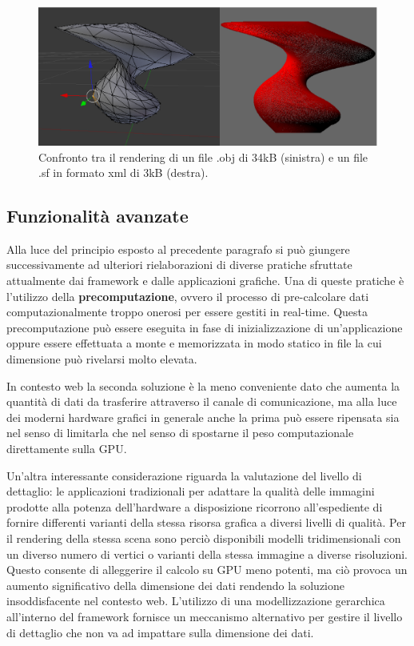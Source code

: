 \begin{figure}
\begin{center}
\includegraphics[width=\textwidth]{Immagini/funghiwall}
\caption[Confronto tra rendering di un file obj e un sf.]{Confronto tra il rendering di un file .obj di 34\ac{kB} (sinistra) e un file .sf in formato xml di 3\ac{kB} (destra).\label{f:funghiwall}} 
\end{center} 
\end{figure}

\subsection{Funzionalit\`a avanzate}
Alla luce del principio esposto al precedente paragrafo si pu\`o giungere successivamente ad ulteriori rielaborazioni di diverse pratiche sfruttate attualmente dai framework e dalle applicazioni grafiche. Una di queste pratiche \`e l'utilizzo della \textbf{precomputazione}, ovvero il processo di pre-calcolare dati computazionalmente troppo onerosi per essere gestiti in real-time. Questa precomputazione pu\`o essere eseguita in fase di inizializzazione di un'applicazione oppure essere effettuata a monte e memorizzata in modo statico in file la cui dimensione pu\`o rivelarsi molto elevata. 

In contesto web la seconda soluzione \`e la meno conveniente dato che aumenta la quantit\`a di dati da trasferire attraverso il canale di comunicazione, ma alla luce dei moderni hardware grafici in generale anche la prima pu\`o essere ripensata sia nel senso di limitarla che nel senso di spostarne il peso computazionale direttamente sulla \ac{GPU}.

Un'altra interessante considerazione riguarda la valutazione del livello di dettaglio: le applicazioni tradizionali per adattare la qualit\`a delle immagini prodotte alla potenza dell'hardware a disposizione ricorrono all'espediente di fornire differenti varianti della stessa risorsa grafica a diversi livelli di qualit\`a. Per il rendering della stessa scena sono perci\`o disponibili modelli tridimensionali con un diverso numero di vertici o varianti della stessa immagine a diverse risoluzioni. Questo consente di alleggerire il calcolo su \ac{GPU} meno potenti, ma ci\`o provoca un aumento significativo della dimensione dei dati rendendo la soluzione insoddisfacente nel contesto web.
L'utilizzo di una modellizzazione gerarchica all'interno del framework fornisce un meccanismo alternativo per gestire il livello di dettaglio che non va ad impattare sulla dimensione dei dati.

